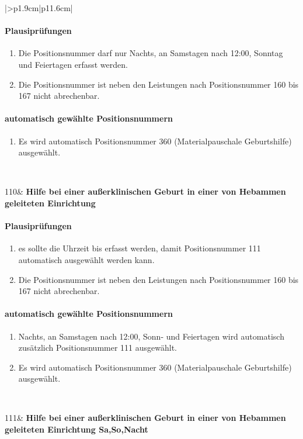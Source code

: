 \begin{mpsupertabular}{|>{\centering}p{1.9cm}|p{11.6cm}|}
\paragraph{Plausiprüfungen}
\begin{enumerate}
\item
Die Positionsnummer darf nur Nachts, an Samstagen nach 12:00, 
Sonntag und Feiertagen erfasst werden.
\item
Die Positionsnummer ist neben den Leistungen nach Positionsnummer 160 bis
167 nicht abrechenbar.
\end{enumerate}
\paragraph{automatisch gewählte Positionsnummern}
\begin{enumerate}
\item
Es wird automatisch Positionsnummer 360 (Materialpauschale Geburtshilfe)
ausgewählt.
\end{enumerate}
\\ \hline


110&
\textbf{Hilfe bei einer außerklinischen Geburt in einer von Hebammen
geleiteten Einrichtung}
\paragraph{Plausiprüfungen}
\begin{enumerate}
\item
es sollte die Uhrzeit bis erfasst werden, damit Positionsnummer 111 
automatisch ausgewählt werden kann.
\item
Die Positionsnummer ist neben den Leistungen nach Positionsnummer 160 bis
167 nicht abrechenbar.
\end{enumerate}
\paragraph{automatisch gewählte Positionsnummern}
\begin{enumerate}
\item
Nachts, an Samstagen nach 12:00, Sonn- und Feiertagen wird automatisch 
zusätzlich Positionsnummer 111 ausgewählt.
\item
Es wird automatisch Positionsnummer 360 (Materialpauschale Geburtshilfe)
ausgewählt.
\end{enumerate}
\\ \hline



111&
\textbf{Hilfe bei einer außerklinischen Geburt in einer von Hebammen
geleiteten Einrichtung Sa,So,Nacht}

\end{mpsupertabular}
